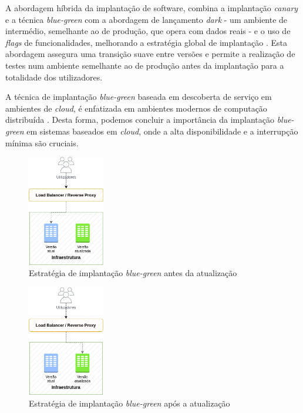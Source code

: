 A abordagem híbrida da implantação de software, combina a implantação \textit{canary} e a técnica 
\textit{blue-green} com a abordagem de lançamento \textit{dark} - um ambiente de intermédio, semelhante
ao de produção, que opera com dados reais - e o uso de \textit{flags} de funcionalidades, 
melhorando a estratégia global de implantação \cite{canary2022}. Esta abordagem assegura uma 
transição suave entre versões e permite a realização de testes num ambiente semelhante ao de 
produção antes da implantação para a totalidade dos utilizadores.

A técnica de implantação \textit{blue-green} baseada em descoberta de serviço em ambientes de 
\textit{cloud}, é enfatizada em ambientes modernos de computação distribuída \cite{bluegreen}. 
Desta forma, podemos concluir a importância da implantação \textit{blue-green} em sistemas baseados 
em \textit{cloud}, onde a alta disponibilidade e a interrupção mínima são cruciais.

\begin{figure}[H]
    \centering
    \includegraphics[width=0.3\textwidth]{media/content/estado-arte/blue-green-before.png}
    \caption{Estratégia de implantação \textit{blue-green} antes da atualização}
    \label{fig:blue-green-before}
\end{figure}

\begin{figure}[H]
    \centering
    \includegraphics[width=0.3\textwidth]{media/content/estado-arte/blue-green-after.png}
    \caption{Estratégia de implantação \textit{blue-green} após a atualização}
    \label{fig:blue-green-after}
\end{figure}

